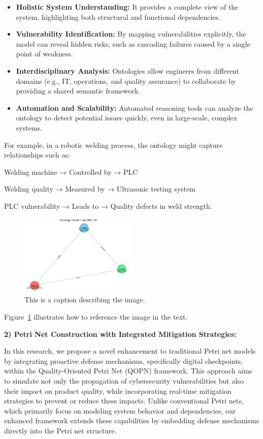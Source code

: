 \documentclass[conference]{IEEEtran}
\begin{document}
\begin{itemize}
    \item \textbf{Holistic System Understanding:} It provides a complete view of the system, highlighting both structural and functional dependencies.
    \item \textbf{Vulnerability Identification:} By mapping vulnerabilities explicitly, the model can reveal hidden risks, such as cascading failures caused by a single point of weakness.
    \item \textbf{Interdisciplinary Analysis:} Ontologies allow engineers from different domains (e.g., IT, operations, and quality assurance) to collaborate by providing a shared semantic framework.
    \item \textbf{Automation and Scalability:} Automated reasoning tools can analyze the ontology to detect potential issues quickly, even in large-scale, complex systems.
\end{itemize}


For example, in a robotic welding process, the ontology might capture relationships such as:

Welding machine → Controlled by → PLC

Welding quality → Measured by → Ultrasonic testing system

PLC vulnerability → Leads to → Quality defects in weld strength.


\begin{figure}[h!]
    \centering
    \includegraphics[width=0.5\textwidth]{ontology.png} 
    \caption{This is a caption describing the image.}
    \label{fig:myimage}
\end{figure}
Figure~\ref{fig:myimage} illustrates how to reference the image in the text.

\textbf{2) Petri Net Construction with Integrated Mitigation Strategies:} 

In this research, we propose a novel enhancement to traditional Petri net models by integrating proactive defense mechanisms, specifically digital checkpoints, within the Quality-Oriented Petri Net (QOPN) framework. This approach aims to simulate not only the propagation of cybersecurity vulnerabilities but also their impact on product quality, while incorporating real-time mitigation strategies to prevent or reduce these impacts. Unlike conventional Petri nets, which primarily focus on modeling system behavior and dependencies, our enhanced framework extends these capabilities by embedding defense mechanisms directly into the Petri net structure.
\end{document}
